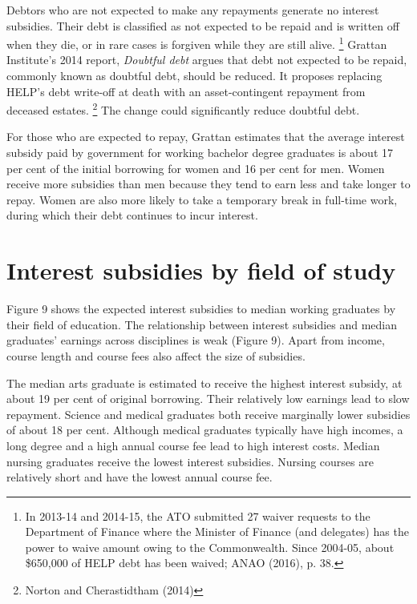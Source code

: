 \documentclass[embargoed]{grattan}
\begin{document}
Debtors who are not expected to make any repayments generate no interest subsidies.
Their debt is classified as not expected to be repaid and is written off when they die, or in rare cases is forgiven while they are still alive.%
\footnote{In 2013-14 and 2014-15, the \gls{ATO} submitted 27 waiver requests to the Department of Finance where the Minister of Finance (and delegates) has the power to waive amount owing to the Commonwealth.
Since 2004-05, about \$650,000 of HELP debt has been waived; ANAO (2016), p. 38.} Grattan Institute's 2014 report, \emph{Doubtful debt} argues that debt not expected to be repaid, commonly known as doubtful debt, should be reduced.
It proposes replacing HELP's debt write-off at death with an asset-contingent repayment from deceased estates.%
\footnote{Norton and Cherastidtham (2014)} The change could significantly reduce doubtful debt.

For those who are expected to repay, Grattan estimates that the average interest subsidy paid by government for working bachelor degree graduates is about 17 per cent of the initial borrowing for women and 16 per cent for men.
Women receive more subsidies than men because they tend to earn less and take longer to repay.
Women are also more likely to take a temporary break in full-time work, during which their debt continues to incur interest.

\section{Interest subsidies by field of study}\label{interest-subsidies-by-field-of-study}

Figure 9 shows the expected interest subsidies to median working graduates by their field of education.
The relationship between interest subsidies and median graduates' earnings across disciplines is weak (Figure 9).
Apart from income, course length and course fees also affect the size of subsidies.

The median arts graduate is estimated to receive the highest interest subsidy, at about 19 per cent of original borrowing.
Their relatively low earnings lead to slow repayment.
Science and medical graduates both receive marginally lower subsidies of about 18 per cent.
Although medical graduates typically have high incomes, a long degree and a high annual course fee lead to high interest costs.
Median nursing graduates receive the lowest interest subsidies.
Nursing courses are relatively short and have the lowest annual course fee.
\end{document}
